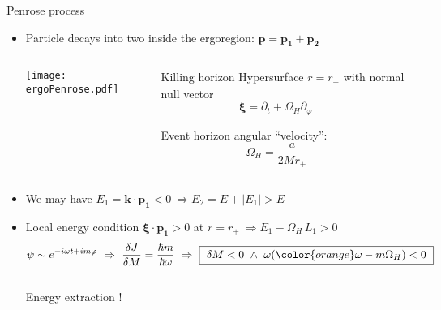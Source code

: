\documentclass[9pt]{beamer}
\begin{document}
\begin{frame}[fragile]{Penrose process}
    \begin{itemize}
        \setlength\itemsep{0.8em}
        \item Particle decays into two inside the ergoregion: $\bm{p} = \bm{p_1} + \bm{p_2}$
        \vspace{0.1cm}
        \begin{columns}[T,onlytextwidth]        
            \begin{column}{0.7\textwidth}
                \centering
                \texttt{[image: ergoPenrose.pdf]}
            \end{column}
            \hfill
            \begin{column}{0.26\textwidth}
                \vspace*{0.5cm}
                \begin{block}{\small Killing horizon}
                    \footnotesize Hypersurface $r=r_{+}$ with normal null vector $$\bm{\xi} = \partial_t + \Omega_H \partial_\varphi \,\qquad$$ 
                    
                    Event horizon angular ``velocity''\texttt{}:
                    $$\Omega_H = \frac{a}{2 M r_+} \qquad$$
                \end{block}
            \end{column}
        \end{columns}
        \vspace{0.3cm}
        \item We may have $E_1 = \bm{k} \cdot \bm{p_1} < 0 ~\Rightarrow E_2 = E + |E_1| > E $
        \item Local energy condition $\bm{\xi}\cdot\bm{p_1}>0$ at $r=r_{+} ~\Rightarrow E_1 - \Omega_H \, L_1 > 0$
        $$ \psi \sim e^{-i \omega t + i m \varphi} ~\Rightarrow~ \frac{\delta J}{\delta M} = \frac{\hbar m}{\hbar \omega} ~\Rightarrow~ \boxed{~\delta M < 0 ~\land~ \omega( {\color{orange} \omega - m \Omega_H } ) < 0~} $$\\
        \hspace*{6.0cm}\alert{Energy extraction !}
    \end{itemize}
\end{frame}
\end{document}
